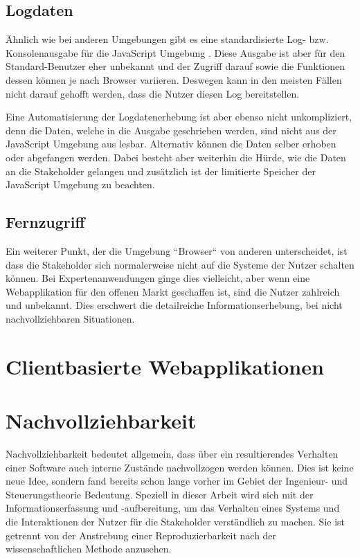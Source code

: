 \subsection{Logdaten}

Ähnlich wie bei anderen Umgebungen gibt es eine standardisierte Log- bzw. Konsolenausgabe für die JavaScript Umgebung \cite{MDNConsole}. Diese Ausgabe ist aber für den Standard-Benutzer eher unbekannt und der Zugriff darauf sowie die Funktionen dessen können je nach Browser variieren. Deswegen kann in den meisten Fällen nicht darauf gehofft werden, dass die Nutzer diesen Log bereitstellen.

Eine Automatisierung der Logdatenerhebung ist aber ebenso nicht unkompliziert, denn die Daten, welche in die Ausgabe geschrieben werden, sind nicht aus der JavaScript Umgebung aus lesbar. Alternativ können die Daten selber erhoben oder abgefangen werden. Dabei besteht aber weiterhin die Hürde, wie die Daten an die Stakeholder gelangen und zusätzlich ist der limitierte Speicher der JavaScript Umgebung zu beachten.

\subsection{Fernzugriff}

Ein weiterer Punkt, der die Umgebung ``Browser`` von anderen unterscheidet, ist dass die Stakeholder sich normalerweise nicht auf die Systeme der Nutzer schalten können. Bei Expertenanwendungen ginge dies vielleicht, aber wenn eine Webapplikation für den offenen Markt geschaffen ist, sind die Nutzer zahlreich und unbekannt. Dies erschwert die detailreiche Informationserhebung, bei nicht nachvollziehbaren Situationen.

\section{Clientbasierte Webapplikationen}

	
\newpage



\newpage

\section{Nachvollziehbarkeit}

	Nachvollziehbarkeit bedeutet allgemein, dass über ein resultierendes Verhalten einer Software auch interne Zustände nachvollzogen werden können. Dies ist keine neue Idee, sondern fand bereits schon lange vorher im Gebiet der Ingenieur- und Steuerungstheorie Bedeutung. Speziell in dieser Arbeit wird sich mit der Informationserfassung und -aufbereitung, um das Verhalten eines Systems und die Interaktionen der Nutzer für die Stakeholder verständlich zu machen. Sie ist getrennt von der Anstrebung einer Reproduzierbarkeit nach der wissenschaftlichen Methode anzusehen.
	
